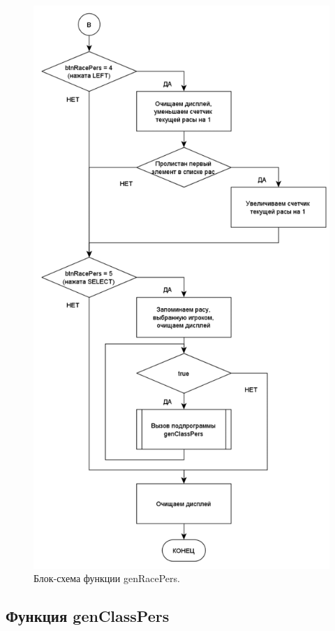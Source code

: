 \begin{figure}[H]
    \centering
    \includegraphics[scale=0.8]{genRacePers2.png}
    \caption{Блок-схема функции genRacePers.}
    \label{fig:race2}
\end{figure}

\subsection*{Функция genClassPers}

